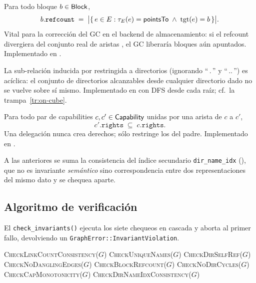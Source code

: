 \begin{invariante}
\label{inv:block-refcount}
Para todo bloque $b \in \textsf{Block}$,
\[
  b.\texttt{refcount}
  \;=\;
  \bigl|\{\, e \in E : \tau_E(e) = \textsf{pointsTo} \;\wedge\; \mathrm{tgt}(e) = b \,\}\bigr|.
\]
Vital para la corrección del GC en el backend de almacenamiento: si el
refcount divergiera del conjunto real de aristas \epointsto, el GC
liberaría bloques aún apuntados. Implementado en
.
\end{invariante}

\begin{invariante}
\label{inv:no-dir-cycles}
La sub-relación inducida por \econtains{} restringida a directorios
(ignorando ``\,.\,'' y ``\,..\,'') es acíclica: el conjunto de
directorios alcanzables desde cualquier directorio dado no se vuelve
sobre sí mismo. Implementado en 
con DFS desde cada raíz; cf.\ la trampa~\ref{tr:on-cube}.
\end{invariante}

\begin{invariante}
\label{inv:cap-monotonicity}
Para todo par de capabilities $c, c' \in \textsf{Capability}$ unidas por una arista
\edelegates{} de $c$ a $c'$,
\[
  c'.\texttt{rights} \;\subseteq\; c.\texttt{rights}.
\]
Una delegación nunca crea derechos; sólo restringe los del padre.
Implementado en .
\end{invariante}

A las anteriores se suma la consistencia del índice secundario
\texttt{dir\_name\_idx} (), que
no es invariante \emph{semántico} sino correspondencia entre dos
representaciones del mismo dato y se chequea aparte.

\subsection*{Algoritmo de verificación}

El \texttt{check\_invariants()} ejecuta los siete chequeos en cascada y
aborta al primer fallo, devolviendo un \texttt{GraphError::InvariantViolation}.

\begin{algorithm}[H]
\SetAlgoLined
{}
\caption{\textsc{CheckInvariants}}\label{alg:check-invariants}

\textsc{CheckLinkCountConsistency}($G$)\;
\textsc{CheckUniqueNames}($G$)\;
\textsc{CheckDirSelfRef}($G$)\;
\textsc{CheckNoDanglingEdges}($G$)\;
\textsc{CheckBlockRefcount}($G$)\;
\textsc{CheckNoDirCycles}($G$)\;
\textsc{CheckCapMonotonicity}($G$)\;
\textsc{CheckDirNameIdxConsistency}($G$)\;
\;
\end{algorithm}

